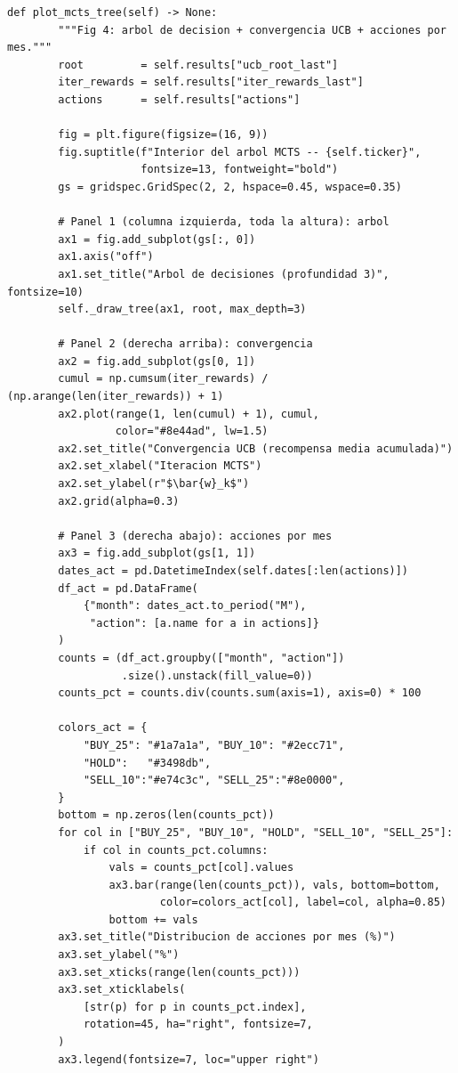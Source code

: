 \documentclass[12pt, a4paper]{article}
\begin{document}
\begin{lstlisting}[caption={Figura 4 -- arbol MCTS y analisis de convergencia}]
    def plot_mcts_tree(self) -> None:
        """Fig 4: arbol de decision + convergencia UCB + acciones por mes."""
        root         = self.results["ucb_root_last"]
        iter_rewards = self.results["iter_rewards_last"]
        actions      = self.results["actions"]

        fig = plt.figure(figsize=(16, 9))
        fig.suptitle(f"Interior del arbol MCTS -- {self.ticker}",
                     fontsize=13, fontweight="bold")
        gs = gridspec.GridSpec(2, 2, hspace=0.45, wspace=0.35)

        # Panel 1 (columna izquierda, toda la altura): arbol
        ax1 = fig.add_subplot(gs[:, 0])
        ax1.axis("off")
        ax1.set_title("Arbol de decisiones (profundidad 3)", fontsize=10)
        self._draw_tree(ax1, root, max_depth=3)

        # Panel 2 (derecha arriba): convergencia
        ax2 = fig.add_subplot(gs[0, 1])
        cumul = np.cumsum(iter_rewards) / (np.arange(len(iter_rewards)) + 1)
        ax2.plot(range(1, len(cumul) + 1), cumul,
                 color="#8e44ad", lw=1.5)
        ax2.set_title("Convergencia UCB (recompensa media acumulada)")
        ax2.set_xlabel("Iteracion MCTS")
        ax2.set_ylabel(r"$\bar{w}_k$")
        ax2.grid(alpha=0.3)

        # Panel 3 (derecha abajo): acciones por mes
        ax3 = fig.add_subplot(gs[1, 1])
        dates_act = pd.DatetimeIndex(self.dates[:len(actions)])
        df_act = pd.DataFrame(
            {"month": dates_act.to_period("M"),
             "action": [a.name for a in actions]}
        )
        counts = (df_act.groupby(["month", "action"])
                  .size().unstack(fill_value=0))
        counts_pct = counts.div(counts.sum(axis=1), axis=0) * 100

        colors_act = {
            "BUY_25": "#1a7a1a", "BUY_10": "#2ecc71",
            "HOLD":   "#3498db",
            "SELL_10":"#e74c3c", "SELL_25":"#8e0000",
        }
        bottom = np.zeros(len(counts_pct))
        for col in ["BUY_25", "BUY_10", "HOLD", "SELL_10", "SELL_25"]:
            if col in counts_pct.columns:
                vals = counts_pct[col].values
                ax3.bar(range(len(counts_pct)), vals, bottom=bottom,
                        color=colors_act[col], label=col, alpha=0.85)
                bottom += vals
        ax3.set_title("Distribucion de acciones por mes (%)")
        ax3.set_ylabel("%")
        ax3.set_xticks(range(len(counts_pct)))
        ax3.set_xticklabels(
            [str(p) for p in counts_pct.index],
            rotation=45, ha="right", fontsize=7,
        )
        ax3.legend(fontsize=7, loc="upper right")


\end{lstlisting}
\end{document}
